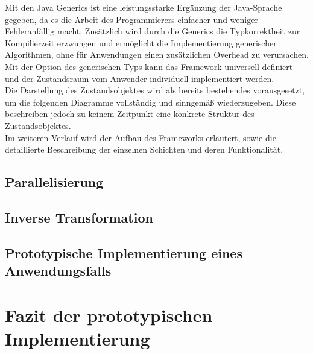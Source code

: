 Mit den Java Generics ist eine leistungsstarke Ergänzung der Java-Sprache gegeben, da es die Arbeit des Programmierers einfacher und 
weniger Fehleranfällig macht. Zusätzlich wird durch die Generics die Typkorrektheit zur Kompilierzeit erzwungen und ermöglicht 
die Implementierung generischer Algorithmen, ohne für Anwendungen einen zusätzlichen Overhead zu verursachen. 
\\
Mit der Option des generischen Typs kann das Framework universell definiert und der Zustandsraum vom Anwender individuell implementiert werden.
\\
\linebreak
Die Darstellung des Zustandsobjektes wird als bereits bestehendes vorausgesetzt, um die folgenden Diagramme vollständig und sinngemäß wiederzugeben. 
Diese beschreiben jedoch zu keinem Zeitpunkt eine konkrete Struktur des Zustandsobjektes. 
\\
\linebreak
Im weiteren Verlauf wird der Aufbau des Frameworks erläutert, sowie die detaillierte Beschreibung der einzelnen Schichten und deren Funktionalität. 

\subsection{Parallelisierung}
\subsection{Inverse Transformation}

\subsection{Prototypische Implementierung eines Anwendungsfalls}


\section{Fazit der prototypischen Implementierung}